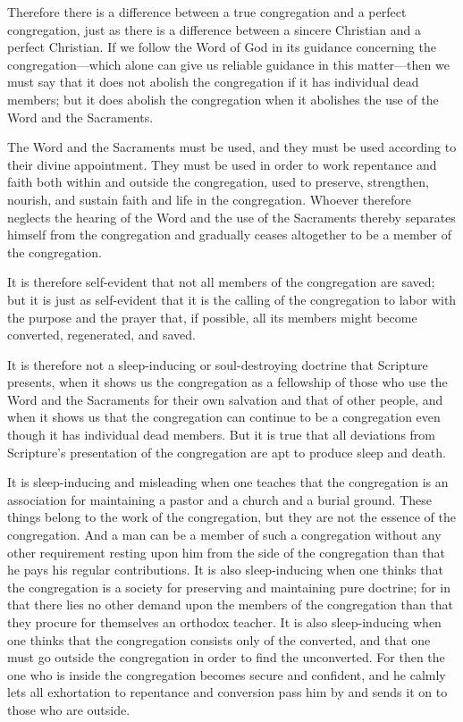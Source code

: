 Therefore there is a difference between a true congregation and a perfect congregation, just as there is a difference between a sincere Christian and a perfect Christian. If we follow the Word of God in its guidance concerning the congregation—which alone can give us reliable guidance in this matter—then we must say that it does not abolish the congregation if it has individual dead members; but it does abolish the congregation when it abolishes the use of the Word and the Sacraments.

The Word and the Sacraments must be used, and they must be used according to their divine appointment. They must be used in order to work repentance and faith both within and outside the congregation, used to preserve, strengthen, nourish, and sustain faith and life in the congregation. Whoever therefore neglects the hearing of the Word and the use of the Sacraments thereby separates himself from the congregation and gradually ceases altogether to be a member of the congregation.

It is therefore self-evident that not all members of the congregation are saved; but it is just as self-evident that it is the calling of the congregation to labor with the purpose and the prayer that, if possible, all its members might become converted, regenerated, and saved.

It is therefore not a sleep-inducing or soul-destroying doctrine that Scripture presents, when it shows us the congregation as a fellowship of those who use the Word and the Sacraments for their own salvation and that of other people, and when it shows us that the congregation can continue to be a congregation even though it has individual dead members. But it is true that all deviations from Scripture’s presentation of the congregation are apt to produce sleep and death.

It is sleep-inducing and misleading when one teaches that the congregation is an association for maintaining a pastor and a church and a burial ground. These things belong to the work of the congregation, but they are not the essence of the congregation. And a man can be a member of such a congregation without any other requirement resting upon him from the side of the congregation than that he pays his regular contributions. It is also sleep-inducing when one thinks that the congregation is a society for preserving and maintaining pure doctrine; for in that there lies no other demand upon the members of the congregation than that they procure for themselves an orthodox teacher. It is also sleep-inducing when one thinks that the congregation consists only of the converted, and that one must go outside the congregation in order to find the unconverted. For then the one who is inside the congregation becomes secure and confident, and he calmly lets all exhortation to repentance and conversion pass him by and sends it on to those who are outside.

